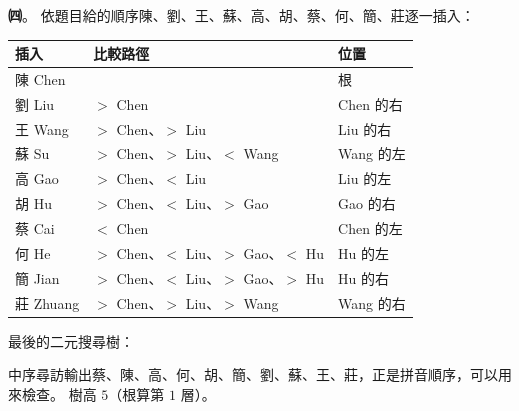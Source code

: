 \begin{pastsoln}
\textbf{㈣}。 依題目給的順序陳、劉、王、蘇、高、胡、蔡、何、簡、莊逐一插入：
\begin{center}
\small
\begin{tabular}{lll}
\toprule
插入 & 比較路徑 & 位置 \\
\midrule
陳 Chen & & 根 \\
劉 Liu & $>$ Chen & Chen 的右 \\
王 Wang & $>$ Chen、$>$ Liu & Liu 的右 \\
蘇 Su & $>$ Chen、$>$ Liu、$<$ Wang & Wang 的左 \\
高 Gao & $>$ Chen、$<$ Liu & Liu 的左 \\
胡 Hu & $>$ Chen、$<$ Liu、$>$ Gao & Gao 的右 \\
蔡 Cai & $<$ Chen & Chen 的左 \\
何 He & $>$ Chen、$<$ Liu、$>$ Gao、$<$ Hu & Hu 的左 \\
簡 Jian & $>$ Chen、$<$ Liu、$>$ Gao、$>$ Hu & Hu 的右 \\
莊 Zhuang & $>$ Chen、$>$ Liu、$>$ Wang & Wang 的右 \\
\bottomrule
\end{tabular}
\end{center}
最後的二元搜尋樹：
\begin{center}
\end{center}
中序尋訪輸出蔡、陳、高、何、胡、簡、劉、蘇、王、莊，正是拼音順序，可以用來檢查。 樹高 $5$（根算第 $1$ 層）。


\end{pastsoln}
